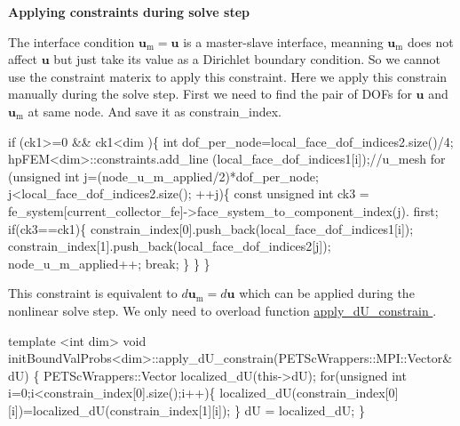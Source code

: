{\bfseries Applying constraints during solve step}\par
 The interface condition $\boldsymbol{u}_\text{m}=\boldsymbol{u}$ is a master-\/slave interface, meanning $\boldsymbol{u}_\text{m}$ does not affect $\boldsymbol{u}$ but just take its value as a Dirichlet boundary condition. So we cannot use the constraint materix to apply this constraint. Here we apply this constrain manually during the solve step. First we need to find the pair of D\-O\-Fs for $\boldsymbol{u}$ and $\boldsymbol{u}_\text{m}$ at same node. And save it as constrain\-\_\-index. 
\begin{DoxyCode}
\textcolor{keywordflow}{if} (ck1>=0 && ck1<dim )\{
        \textcolor{keywordtype}{int} dof\_per\_node=local\_face\_dof\_indices2.size()/4;
        hpFEM<dim>::constraints.add\_line (local\_face\_dof\_indices1[i]);\textcolor{comment}{//u\_mesh                             
                               }
        \textcolor{keywordflow}{for} (\textcolor{keywordtype}{unsigned} \textcolor{keywordtype}{int} j=(node\_u\_m\_applied/2)*dof\_per\_node; j<local\_face\_dof\_indices2.size(); ++j)\{
            \textcolor{keyword}{const} \textcolor{keywordtype}{unsigned} \textcolor{keywordtype}{int} ck3 = fe\_system[current\_collector\_fe]->face\_system\_to\_component\_index(j).
      first;
            \textcolor{keywordflow}{if}(ck3==ck1)\{
                constrain\_index[0].push\_back(local\_face\_dof\_indices1[i]);
                constrain\_index[1].push\_back(local\_face\_dof\_indices2[j]);
                node\_u\_m\_applied++;
                \textcolor{keywordflow}{break};
            \}
        \}                       
    \}   
\end{DoxyCode}
 This constraint is equivalent to $d\boldsymbol{u}_\text{m}=d\boldsymbol{u}$ which can be applied during the nonlinear solve step. We only need to overload function \hyperlink{classsolve_class_a029ece57f667fa697cb29eb482eff31b}{apply\-\_\-d\-U\-\_\-constrain }. 
\begin{DoxyCode}
\textcolor{keyword}{template} <\textcolor{keywordtype}{int} dim>
\textcolor{keywordtype}{void} initBoundValProbs<dim>::apply_dU_constrain(PETScWrappers::MPI::Vector& dU)
\{
    PETScWrappers::Vector localized\_dU(this->dU);   
  \textcolor{keywordflow}{for}(\textcolor{keywordtype}{unsigned} \textcolor{keywordtype}{int} i=0;i<constrain\_index[0].size();i++)\{
        localized\_dU(constrain\_index[0][i])=localized\_dU(constrain\_index[1][i]);
    \}
    dU = localized\_dU;
\}
\end{DoxyCode}
